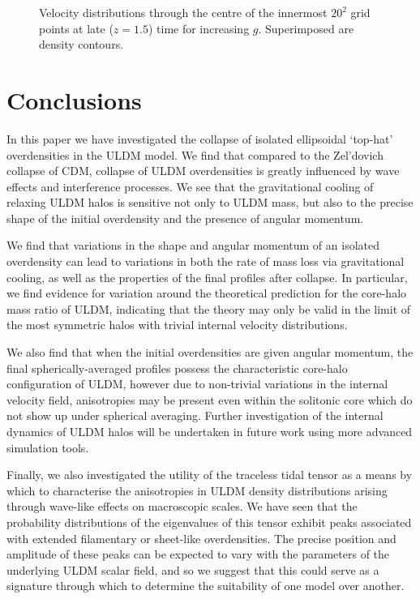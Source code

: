 \documentclass[a4paper,11pt]{article}
\begin{document}
\begin{figure}[!htb]
\caption{Velocity distributions through the centre of the innermost $20^2$ grid points at late ($z = 1.5$) time for increasing $g$. Superimposed are density contours.}
\label{fig:vels_final_contours}
\end{figure}















\section{Conclusions}\label{sec:conclusion}


In this paper we have investigated the collapse of isolated ellipsoidal `top-hat' overdensities in the ULDM model. We find that compared to the Zel'dovich collapse of CDM, collapse of ULDM overdensities is greatly influenced by wave effects and interference processes. We see that the gravitational cooling of relaxing ULDM halos is sensitive not only to ULDM mass, but also to the precise shape of the initial overdensity and the presence of angular momentum. 

We find that variations in the shape and angular momentum of an isolated overdensity can lead to variations in both the rate of mass loss via gravitational cooling, as well as the properties of the final profiles after collapse. In particular, we find evidence for variation around the theoretical prediction for the core-halo mass ratio of ULDM, indicating that the theory may only be valid in the limit of the most symmetric halos with trivial internal velocity distributions. 

We also find that when the initial overdensities are given angular momentum, the final spherically-averaged profiles possess the characteristic core-halo configuration of ULDM, however due to non-trivial variations in the internal velocity field, anisotropies may be present even within the solitonic core which do not show up under spherical averaging. Further investigation of the internal dynamics of ULDM halos will be undertaken in future work using more advanced simulation tools. 

Finally, we also investigated the utility of the traceless tidal tensor as a means by which to characterise the anisotropies in ULDM density distributions arising through wave-like effects on macroscopic scales. We have seen that the probability distributions of the eigenvalues of this tensor exhibit peaks associated with extended filamentary or sheet-like overdensities. The precise position and amplitude of these peaks can be expected to vary with the parameters of the underlying ULDM scalar field, and so we suggest that this could serve as a signature through which to determine the suitability of one model over another. 
\end{document}
